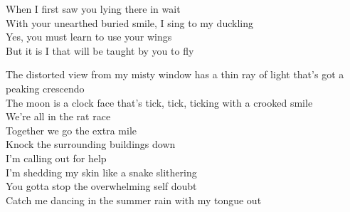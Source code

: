 
When I first saw you lying there in wait\\
With your unearthed buried smile, I sing to my duckling\\
Yes, you must learn to use your wings\\
But it is I that will be taught by you to fly\\


The distorted view from my misty window has a thin ray of light that's got a peaking crescendo\\
The moon is a clock face that's tick, tick, ticking with a crooked smile\\
We're all in the rat race\\
Together we go the extra mile\\

Knock the surrounding buildings down\\
I'm calling out for help\\
I'm shedding my skin like a snake slithering\\
You gotta stop the overwhelming self doubt\\
Catch me dancing in the summer rain with my tongue out\\
